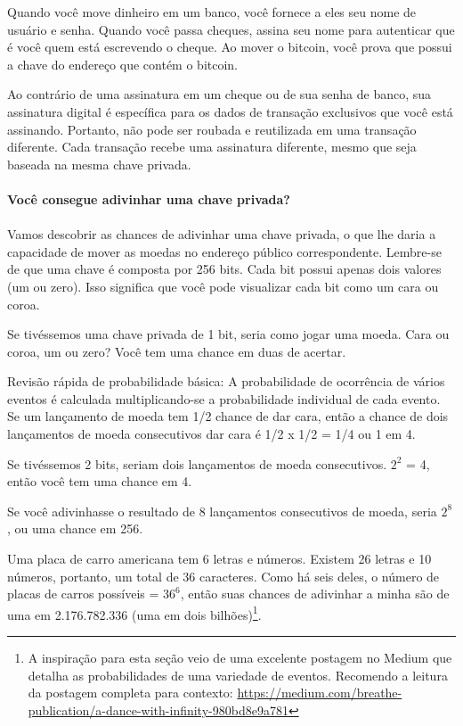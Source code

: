 Quando você move dinheiro em um banco, você fornece a eles seu nome de usuário e senha. Quando você passa cheques, assina seu nome para autenticar que é você quem está escrevendo o cheque. Ao mover o bitcoin, você prova que possui a chave do endereço que contém o bitcoin.

Ao contrário de uma assinatura em um cheque ou de sua senha de banco, sua assinatura digital é específica para os dados de transação exclusivos que você está assinando. Portanto, não pode ser roubada e reutilizada em uma transação diferente. Cada transação recebe uma assinatura diferente, mesmo que seja baseada na mesma chave privada.
\newpage
\paragraph{Você consegue adivinhar uma chave privada?}
\paragraph{}

Vamos descobrir as chances de adivinhar uma chave privada, o que lhe daria a capacidade de mover as moedas no endereço público correspondente. Lembre-se de que uma chave é composta por 256 bits. Cada bit possui apenas dois valores (um ou zero). Isso significa que você pode visualizar cada bit como um cara ou coroa.

Se tivéssemos uma chave privada de 1 bit, seria como jogar uma moeda. Cara ou coroa, um ou zero? Você tem uma chance em duas de acertar.

Revisão rápida de probabilidade básica: A probabilidade de ocorrência de vários eventos é calculada multiplicando-se a probabilidade individual de cada evento. Se um lançamento de moeda tem 1/2 chance de dar cara, então a chance de dois lançamentos de moeda consecutivos dar cara é 1/2 x 1/2 = 1/4 ou 1 em 4.

Se tivéssemos 2 bits, seriam dois lançamentos de moeda consecutivos. \(2^2\) = 4, então você tem uma chance em 4.

Se você adivinhasse o resultado de 8 lançamentos consecutivos de moeda, seria \(2^8\), ou uma chance em 256.

Uma placa de carro americana tem 6 letras e números. Existem 26 letras e 10 números, portanto, um total de 36 caracteres. Como há seis deles, o número de placas de carros possíveis = \(36^6\), então suas chances de adivinhar a minha são de uma em 2.176.782.336 (uma em dois bilhões)\footnote{A inspiração para esta seção veio de uma excelente postagem no Medium que detalha as probabilidades de uma variedade de eventos. Recomendo a leitura da postagem completa para contexto: \url{https://medium.com/breathe-publication/a-dance-with-infinity-980bd8e9a781}}.

